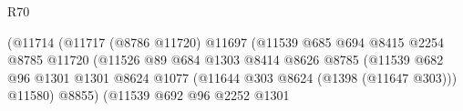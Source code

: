 \begin{lexlean}{R70}
\begin{coremodule}
                                                          (@11714
                                                            (@11717
                                                              (@8786 @11720)
                                                              @11697
                                                              (@11539
                                                                @685
                                                                @694
                                                                @8415
                                                                @2254
                                                                @8785
                                                                @11720
                                                                (@11526
                                                                  @89
                                                                  @684
                                                                  @1303
                                                                  @8414
                                                                  @8626
                                                                  @8785
                                                                  (@11539
                                                                    @682
                                                                    @96
                                                                    @1301
                                                                    @1301
                                                                    @8624
                                                                    @1077
                                                                    (@11644
                                                                      @303
                                                                      @8624
                                                                      (@1398 (@11647 @303)))
                                                                    @11580)
                                                                  @8855)
                                                                (@11539
                                                                  @692
                                                                  @96
                                                                  @2252
                                                                  @1301

\end{coremodule}
\end{lexlean}
